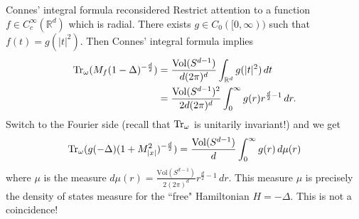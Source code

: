 \documentclass{beamer}
\numberwithin{equation}{section}
\theoremstyle{plain}
\theoremstyle{plain}
\theoremstyle{definition}
\theoremstyle{plain}
\theoremstyle{plain}
\theoremstyle{definition}
\newcommand{\tr}{{\rm Tr}}
\newcommand{\Vol}{\mathrm{Vol}}
\newcommand{\Rl}{\mathbb{R}}
\begin{document}
% 

\begin{frame}{Connes' integral formula reconsidered}
    Restrict attention to a function $f \in C^\infty_c(\Rl^d)$ which is radial. There exists $g \in C_0([0,\infty))$ such that $f(t) = g(|t|^2)$. Then Connes' integral formula implies
    \begin{align*}
        \tr_{\omega}(M_f(1-\Delta)^{-\frac{d}{2}}) &= \frac{\Vol(S^{d-1})}{d(2\pi)^d} \int_{\Rl^d} g(|t|^2)\,dt\\
                                                   &= \frac{\Vol(S^{d-1})^2}{2d(2\pi)^d}\int_{0}^\infty g(r)r^{\frac{d}{2}-1}\,dr.
    \end{align*}\pause
    Switch to the Fourier side (recall that $\tr_{\omega}$ is unitarily invariant!) and we get
    $$
        \tr_{\omega}(g(-\Delta)(1+M_{|x|}^2)^{-\frac{d}{2}}) = \frac{\Vol(S^{d-1})}{d}\int_0^{\infty} g(r) \,d\mu(r)
    $$
    where $\mu$ is the measure $d\mu(r) = \frac{\Vol(S^{d-1})}{2(2\pi)^d}r^{\frac{d}{2}-1}\,dr.$
     \pause
    This measure $\mu$ is precisely the density of states measure for the ``free" Hamiltonian $H = -\Delta$. This is not a coincidence!
\end{frame}
\end{document}
